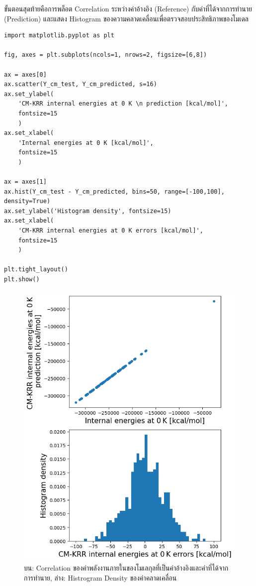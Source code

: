 \vspace{1em}

\noindent ขั้นตอนสุดท้ายคือการพล็อต Correlation ระหว่างค่าอ้างอิง (Reference) กับค่าที่ได้จากการทำนาย (Prediction) และแสดง Histogram ของความคลาดเคลื่อนเพื่อตรวจสอบประสิทธิภาพของโมเดล

\begin{lstlisting}[style=MyPython]
import matplotlib.pyplot as plt

fig, axes = plt.subplots(ncols=1, nrows=2, figsize=[6,8])

ax = axes[0]
ax.scatter(Y_cm_test, Y_cm_predicted, s=16)
ax.set_ylabel(
    'CM-KRR internal energies at 0 K \n prediction [kcal/mol]', 
    fontsize=15
    )
ax.set_xlabel(
    'Internal energies at 0 K [kcal/mol]', 
    fontsize=15
    )

ax = axes[1]
ax.hist(Y_cm_test - Y_cm_predicted, bins=50, range=[-100,100], density=True)
ax.set_ylabel('Histogram density', fontsize=15)
ax.set_xlabel(
    'CM-KRR internal energies at 0 K errors [kcal/mol]', 
    fontsize=15
    )

plt.tight_layout()
plt.show()
\end{lstlisting}

\begin{figure}[H]
    \centering
    \includegraphics[width=0.7\linewidth]{fig/qm9_cm_kernel_corr.png}
    \caption{บน: Correlation ของค่าพลังงานภายในของโมเลกุลที่เป็นค่าอ้างอิงและค่าที่ได้จากการทำนาย, ล่าง: Histrogram Density ของค่าคลาดเคลื่อน}
    \label{fig:qm9_cm_kernel_corr}
\end{figure}

